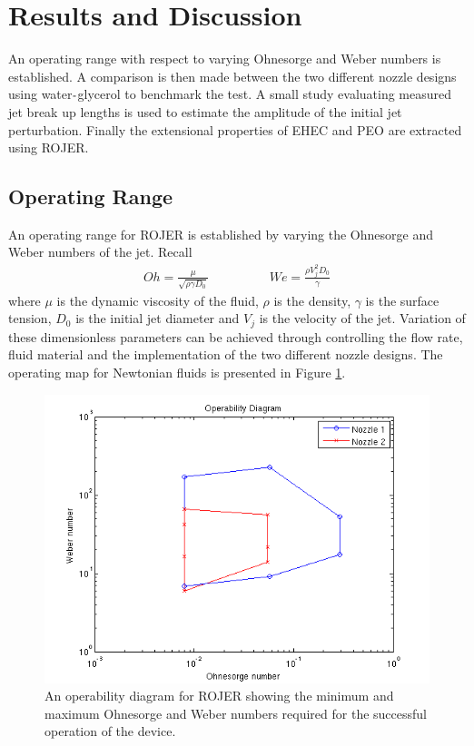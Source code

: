 \documentclass[11pt]{article}
\begin{document}
\newpage

\section{Results and Discussion}
An operating range with respect to varying Ohnesorge and Weber numbers is established. A comparison is then made between the two different nozzle designs using water${\text -}$glycerol to benchmark the test. A small study evaluating measured jet break up lengths is used to estimate the amplitude of the initial jet perturbation. Finally the extensional properties of EHEC and PEO are extracted using ROJER.

\subsection{Operating Range} \label{sec:operating}
An operating range for ROJER is established by varying the Ohnesorge and Weber numbers of the jet. Recall
\begin{align}
Oh = \frac{\mu}{\sqrt{\rho \gamma D_0}} \hspace{2cm} We = \frac{\rho V_j^2 D_0}{\gamma}
\end{align}
where $\mu$ is the dynamic viscosity of the fluid, $\rho$ is the density, $\gamma$ is the surface tension, $D_0$ is the initial jet diameter and $V_j$ is the velocity of the jet. Variation of these dimensionless parameters can be achieved through controlling the flow rate, fluid material and the implementation of the two different nozzle designs. The operating map for Newtonian fluids is presented in Figure \ref{fig:operability}.
\begin{figure}[h]
	\begin{center}
		\includegraphics[scale=0.5]{img/operability.png}
		\caption{An operability diagram for ROJER showing the minimum and maximum Ohnesorge and Weber numbers required for the successful operation of the device.}
		\label{fig:operability}
	\end{center}
\end{figure}
\end{document}
